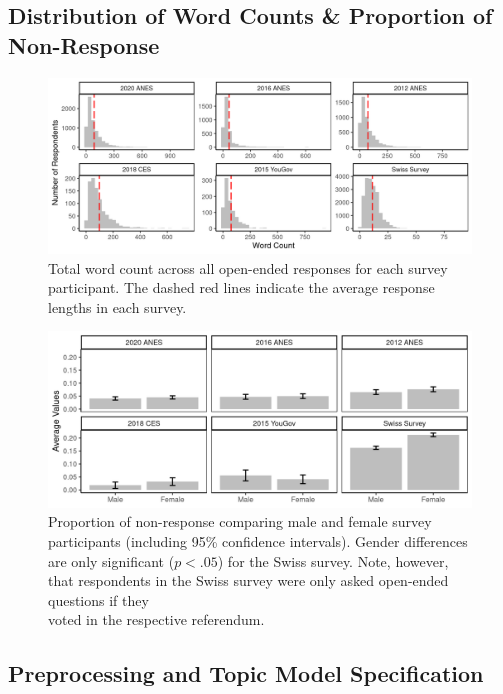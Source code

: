 \subsection{Distribution of Word Counts \& Proportion of Non-Response}
\begin{figure}[ht]\centering
	\includegraphics{../fig/wc.png}
	\caption[Total word count across all open-ended responses]{Total word count across all open-ended responses for each survey participant. The dashed red lines indicate the average response lengths in each survey.}\label{fig:wc}
\end{figure}

\begin{figure}[ht]\centering
	\includegraphics{../fig/noresponse.png}
	\caption{Proportion of non-response comparing male and female survey participants (including 95\% confidence intervals). Gender differences are only significant ($p<.05$) for the Swiss survey. Note, however, that respondents in the Swiss survey were only asked open-ended questions if they \\
		voted in the respective referendum.}
\end{figure}


\clearpage
\subsection{Preprocessing and Topic Model Specification}

